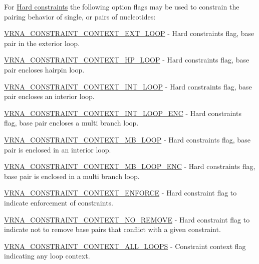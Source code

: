 For \hyperlink{group__hard__constraints}{Hard constraints} the following option flags may be used to constrain the pairing behavior of single, or pairs of nucleotides\+:


\begin{DoxyItemize}
\item \hyperlink{group__hard__constraints_ga9418eda62a5dec070896702c279d2548}{V\+R\+N\+A\+\_\+\+C\+O\+N\+S\+T\+R\+A\+I\+N\+T\+\_\+\+C\+O\+N\+T\+E\+X\+T\+\_\+\+E\+X\+T\+\_\+\+L\+O\+OP} -\/ Hard constraints flag, base pair in the exterior loop.
\item \hyperlink{group__hard__constraints_ga79203702b197b6b9d3b78eed40663eb1}{V\+R\+N\+A\+\_\+\+C\+O\+N\+S\+T\+R\+A\+I\+N\+T\+\_\+\+C\+O\+N\+T\+E\+X\+T\+\_\+\+H\+P\+\_\+\+L\+O\+OP} -\/ Hard constraints flag, base pair encloses hairpin loop.
\item \hyperlink{group__hard__constraints_ga21feeab3a9e5fa5a9e3d9ac0fcf5994f}{V\+R\+N\+A\+\_\+\+C\+O\+N\+S\+T\+R\+A\+I\+N\+T\+\_\+\+C\+O\+N\+T\+E\+X\+T\+\_\+\+I\+N\+T\+\_\+\+L\+O\+OP} -\/ Hard constraints flag, base pair encloses an interior loop.
\item \hyperlink{group__hard__constraints_ga0536288e04ff6332ecdc23ca4705402b}{V\+R\+N\+A\+\_\+\+C\+O\+N\+S\+T\+R\+A\+I\+N\+T\+\_\+\+C\+O\+N\+T\+E\+X\+T\+\_\+\+I\+N\+T\+\_\+\+L\+O\+O\+P\+\_\+\+E\+NC} -\/ Hard constraints flag, base pair encloses a multi branch loop.
\item \hyperlink{group__hard__constraints_ga456ecd2ff00056bb64da8dd4f61bbfc5}{V\+R\+N\+A\+\_\+\+C\+O\+N\+S\+T\+R\+A\+I\+N\+T\+\_\+\+C\+O\+N\+T\+E\+X\+T\+\_\+\+M\+B\+\_\+\+L\+O\+OP} -\/ Hard constraints flag, base pair is enclosed in an interior loop.
\item \hyperlink{group__hard__constraints_ga02a3d703ddbcfce393e4bbfcb9db7077}{V\+R\+N\+A\+\_\+\+C\+O\+N\+S\+T\+R\+A\+I\+N\+T\+\_\+\+C\+O\+N\+T\+E\+X\+T\+\_\+\+M\+B\+\_\+\+L\+O\+O\+P\+\_\+\+E\+NC} -\/ Hard constraints flag, base pair is enclosed in a multi branch loop.
\item \hyperlink{constraints__hard_8h_a1aa55f2c6347e670e003b1a765632dad}{V\+R\+N\+A\+\_\+\+C\+O\+N\+S\+T\+R\+A\+I\+N\+T\+\_\+\+C\+O\+N\+T\+E\+X\+T\+\_\+\+E\+N\+F\+O\+R\+CE} -\/ Hard constraint flag to indicate enforcement of constraints.
\item \hyperlink{constraints__hard_8h_a9fcac36535850ff612c7e6b1305304a1}{V\+R\+N\+A\+\_\+\+C\+O\+N\+S\+T\+R\+A\+I\+N\+T\+\_\+\+C\+O\+N\+T\+E\+X\+T\+\_\+\+N\+O\+\_\+\+R\+E\+M\+O\+VE} -\/ Hard constraint flag to indicate not to remove base pairs that conflict with a given constraint.
\item \hyperlink{group__hard__constraints_ga886d9127c49bb982a4b67cd7581e8a5a}{V\+R\+N\+A\+\_\+\+C\+O\+N\+S\+T\+R\+A\+I\+N\+T\+\_\+\+C\+O\+N\+T\+E\+X\+T\+\_\+\+A\+L\+L\+\_\+\+L\+O\+O\+PS} -\/ Constraint context flag indicating any loop context.
\end{DoxyItemize}

